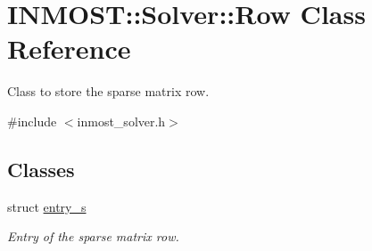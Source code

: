 \hypertarget{classINMOST_1_1Solver_1_1Row}{\section{I\-N\-M\-O\-S\-T\-:\-:Solver\-:\-:Row Class Reference}
\label{classINMOST_1_1Solver_1_1Row}
}


Class to store the sparse matrix row.  




{\ttfamily \#include $<$inmost\-\_\-solver.\-h$>$}

\subsection*{Classes}
\begin{DoxyCompactItemize}
\item 
struct \hyperlink{structINMOST_1_1Solver_1_1Row_1_1entry__s}{entry\-\_\-s}
\begin{DoxyCompactList}\small\item\em Entry of the sparse matrix row. \end{DoxyCompactList}\end{DoxyCompactItemize}
